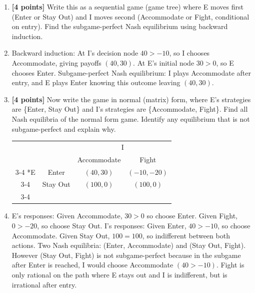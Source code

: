 \documentclass[11pt]{article}
\begin{document}
\begin{enumerate}[label=(\alph*)]
    \item \textbf{[4 points]} Write this as a sequential game (game tree) where E moves first (Enter or Stay Out) and I moves second (Accommodate or Fight, conditional on entry). Find the subgame-perfect Nash equilibrium using backward induction.
    
\begin{center}
\end{center}

\item[] Backward induction: At I's decision node $40>-10$, so I chooses Accommodate, giving payoffs $(40,30)$. At E's initial node $30>0$, so E chooses Enter. Subgame-perfect Nash equilibrium: I plays Accommodate after entry, and E plays Enter knowing this outcome leaving $(40,30)$.
    
    \item \textbf{[4 points]} Now write the game in normal (matrix) form, where E's strategies are \{Enter, Stay Out\} and I's strategies are \{Accommodate, Fight\}. Find all Nash equilibria of the normal form game. Identify any equilibrium that is not subgame-perfect and explain why.
    
\begin{center}
\begin{tabular}{cc|c|c|}
 & \multicolumn{1}{c}{} & \multicolumn{2}{c}{I}\\
 & \multicolumn{1}{c}{} & \multicolumn{1}{c}{Accommodate} & \multicolumn{1}{c}{Fight} \\\cline{3-4}
\multirow{2}*{E} & Enter & $(40, 30)$ & $(-10, -20)$ \\\cline{3-4}
 & Stay Out & $(100, 0)$ & $(100, 0)$ \\\cline{3-4}
\end{tabular}
\end{center}

\item[] E's responses: Given Accommodate, $30>0$ so choose Enter. Given Fight, $0>-20$, so choose Stay Out. I's responses: Given Enter, $40>-10$, so choose Accommodate. Given Stay Out, $100=100$, so indifferent between both actions. Two Nash equilibria: (Enter, Accommodate) and (Stay Out, Fight). However (Stay Out, Fight) is not subgame-perfect because in the subgame after Enter is reached, I would choose Accommodate $(40>-10)$. Fight is only rational on the path where E stays out and I is indifferent, but is irrational after entry.
    

\end{enumerate}
\end{document}
